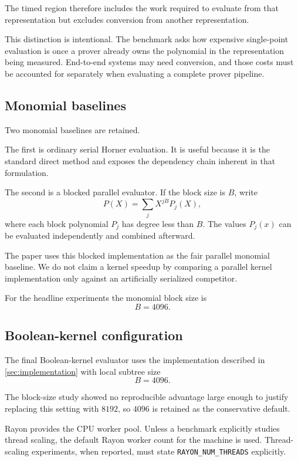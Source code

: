 The timed region therefore includes the work required to evaluate from that
representation but excludes conversion from another representation.

This distinction is intentional. The benchmark asks how expensive
single-point evaluation is once a prover already owns the polynomial in the
representation being measured. End-to-end systems may need conversion, and
those costs must be accounted for separately when evaluating a complete
prover pipeline.

\subsection{Monomial baselines}

Two monomial baselines are retained.

The first is ordinary serial Horner evaluation. It is useful because it is
the standard direct method and exposes the dependency chain inherent in
that formulation.

The second is a blocked parallel evaluator. If the block size is \(B\),
write
\[
P(X)
=
\sum_j X^{jB}P_j(X),
\]
where each block polynomial \(P_j\) has degree less than \(B\).
The values \(P_j(x)\) can be evaluated independently and combined
afterward.

The paper uses this blocked implementation as the fair parallel monomial
baseline. We do not claim a kernel speedup by comparing a parallel kernel
implementation only against an artificially serialized competitor.

For the headline experiments the monomial block size is
\[
B=4096.
\]

\subsection{Boolean-kernel configuration}

The final Boolean-kernel evaluator uses the implementation described in
\cref{sec:implementation} with local subtree size
\[
B=4096.
\]

The block-size study showed no reproducible advantage large enough to
justify replacing this setting with \(8192\), so \(4096\) is retained as
the conservative default.

Rayon provides the CPU worker pool. Unless a benchmark explicitly studies
thread scaling, the default Rayon worker count for the machine is used.
Thread-scaling experiments, when reported, must state
\texttt{RAYON\_NUM\_THREADS} explicitly.

